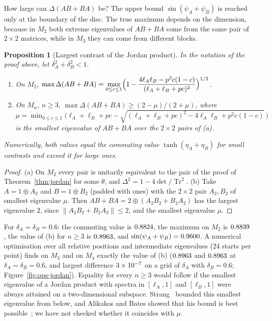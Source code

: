 \documentclass[11pt]{article}
\DeclareMathOperator{\Tr}{Tr}
\theoremstyle{plain}
\newtheorem{proposition}[theorem]{Proposition}
\theoremstyle{definition}
\theoremstyle{remark}
\begin{document}
How large can $\Delta(AB+BA)$ be? The upper bound $\sin(\psi_A+\psi_B)$ is reached only at the boundary of the disc. The
true maximum depends on the dimension, because in $M_2$ both extreme eigenvalues of $AB+BA$ come from the same pair of
$2\times2$ matrices, while in $M_3$ they can come from different blocks.

\begin{proposition}[Largest contrast of the Jordan product]\label{prop:jordanmax}
In the notation of the proof above, let $\delta_A^2+\delta_B^2<1$.
\begin{enumerate}
\item[(a)] On $M_2$, $\displaystyle\max\Delta(AB+BA)=\max_{0\le c\le1}\Bigl(1-\frac{4\ell_A\ell_B-p^2c(1-c)}{(\ell_A+\ell_B+pc)^2}\Bigr)^{1/2}$.
\item[(b)] On $M_n$, $n\ge3$, $\max\Delta(AB+BA)\ge(2-\mu)/(2+\mu)$, where
$\mu=\min_{0\le c\le1}\bigl(\ell_A+\ell_B+pc-\sqrt{(\ell_A+\ell_B+pc)^2-4\ell_A\ell_B+p^2c(1-c)}\,\bigr)$ is the smallest eigenvalue of $AB+BA$ over the
$2\times2$ pairs of (a).
\end{enumerate}
Numerically, both values equal the commuting value $\tanh(\eta_A+\eta_B)$ for small contrasts and exceed it for large ones.
\end{proposition}
\begin{proof}
(a) On $M_2$ every pair is unitarily equivalent to the pair of the proof of Theorem~\ref{thm:jordan} for some $\theta$,
and $\Delta^2=1-4\det/\Tr^2$. (b) Take $A=1\oplus A_2$ and $B=1\oplus B_2$ (padded with ones) with the $2\times2$ pair
$A_2,B_2$ of smallest eigenvalue $\mu$. Then $AB+BA=2\oplus(A_2B_2+B_2A_2)$ has the largest eigenvalue $2$, since
$\|A_2B_2+B_2A_2\|\le2$, and the smallest eigenvalue $\mu$.
\end{proof}

For $\delta_A=\delta_B=0.6$: the commuting value is $0.8824$, the maximum on $M_2$ is $0.8839$, the value of (b)
for $n\ge3$ is $0.8963$, and $\sin(\psi_A+\psi_B)=0.9600$. A numerical optimisation over all relative
positions and intermediate eigenvalues (24 starts per point) finds on $M_3$ and on $M_4$ exactly the value of (b)
($0.8963$ and $0.8963$ at $\delta_A=\delta_B=0.6$, and largest difference $3\times10^{-7}$ on a grid
of $\delta_A$ with $\delta_B=0.6$; Figure~\ref{fig:ops-jordan}). Equality for
every $n\ge3$ would follow if the smallest eigenvalue of a Jordan product with spectra in $[\ell_A,1]$ and $[\ell_B,1]$
were always attained on a two-dimensional subspace. Strang~\cite{strang1962} bounded this smallest eigenvalue from below,
and Alikakos and Bates showed that his bound is best possible~\cite{alikakos1985}; we have not checked whether it
coincides with $\mu$.
\end{document}
